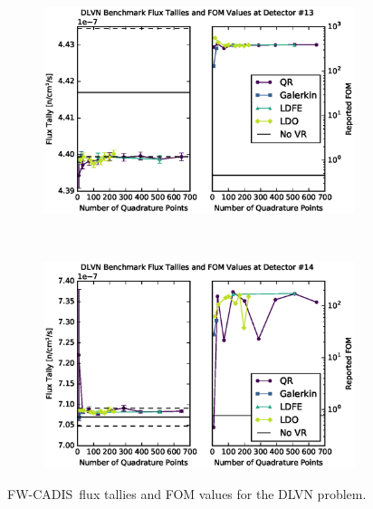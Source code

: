 \documentclass{article} %
\newcommand{\fwc}{\mbox{FW-CADIS}}
\begin{document}
\begin{figure}[!htb]
\ContinuedFloat
\begin{subfigure}{\linewidth}
\centering
\includegraphics[max height=0.445\textheight]
{dlvn-fwcadis-13.eps}
\label{dlvn-fwc-13}
\end{subfigure} 
\\
\begin{subfigure}{\linewidth}
\centering
\includegraphics[max height=0.445\textheight]
{dlvn-fwcadis-14.eps}
\label{dlvn-fwc-14}
\end{subfigure}
\caption{\fwc\ flux tallies and FOM values for the DLVN problem.}
\label{dlvn-fwc-tally}
\end{figure}

\FloatBarrier
\end{document}
